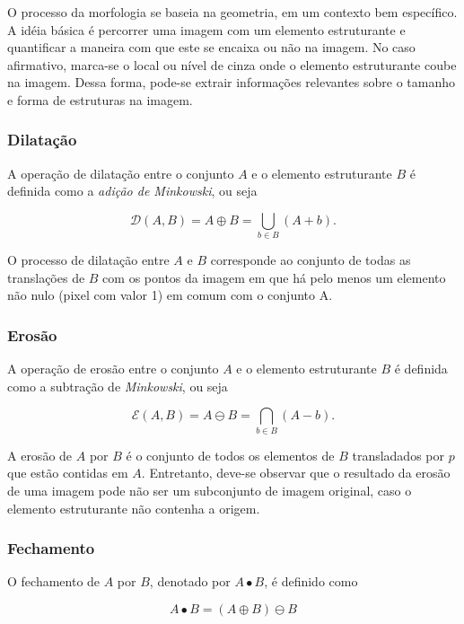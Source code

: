 \documentclass[twoside,twocolumn]{article}
\begin{document}
O processo da morfologia se baseia na geometria, em um contexto bem específico. A idéia básica é percorrer uma imagem com um elemento estruturante e quantificar a maneira com que este se encaixa ou não na imagem. No caso afirmativo, marca-se o local ou nível de cinza onde o elemento estruturante coube na imagem. Dessa forma, pode-se extrair informações relevantes sobre o tamanho e forma de estruturas na imagem.

\subsubsection{Dilatação}

A operação de dilatação entre o conjunto $A$ e o elemento estruturante $B$ é definida como a \textit{adição de Minkowski}, ou seja

\begin{equation}
	\mathcal{D}(A,B) = A \oplus B = \bigcup_{b \in B} (A + b).
\end{equation}

O processo de dilatação entre $A$ e $B$ corresponde ao conjunto de todas as translações de $B$ com os pontos da imagem em que há pelo menos um elemento não nulo (pixel com valor 1) em comum com o conjunto A.

\subsubsection{Erosão}

A operação de erosão entre o conjunto $A$ e o elemento estruturante $B$ é definida como a subtração de \textit{Minkowski}, ou seja

\begin{equation}
	\mathcal{E}(A,B) = A \ominus B = \bigcap_{b \in B} (A - b).
\end{equation}

A erosão de $A$ por $B$ é o conjunto de todos os elementos de $B$ transladados por $p$ que estão contidas em $A$. Entretanto, deve-se observar que o resultado da erosão de uma imagem pode não ser um subconjunto de imagem original, caso o elemento estruturante não contenha a origem.

\subsubsection{Fechamento}

O fechamento de $A$ por $B$, denotado por $A \bullet B$, é definido como

\begin{equation}
	A \bullet B = (A \oplus B) \ominus B
\end{equation}
\end{document}
